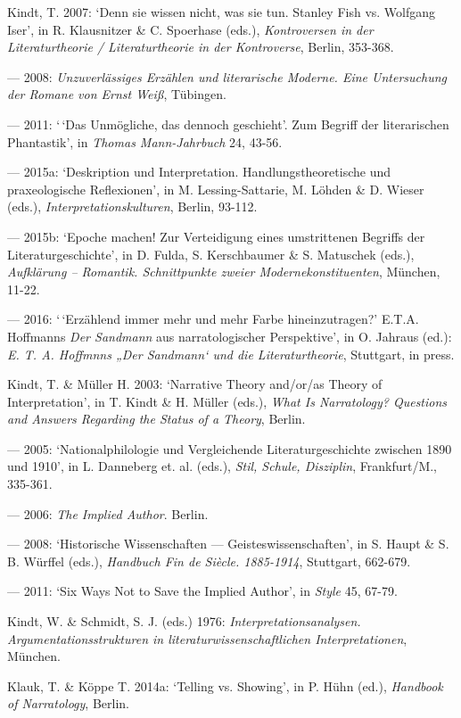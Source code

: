 \begin{hangparas}{.5cm}{1}
Kindt, T. 2007: `Denn sie wissen nicht, was sie tun. Stanley Fish vs. Wolfgang Iser', in R. Klausnitzer \& C. Spoerhase (eds.), \emph{Kontroversen in der Literaturtheorie / Literaturtheorie in der Kontroverse}, Berlin, 353-368.

--- 2008: \emph{Unzuverl\"assiges Erz\"ahlen und literarische Moderne. Eine Untersuchung der Romane von Ernst Wei{\ss}}, T\"ubingen. 

--- 2011: `\,`Das Unm\"ogliche, das dennoch geschieht'. Zum Begriff der literarischen Phantastik', in \emph{Thomas Mann-Jahrbuch} 24, 43-56.

--- 2015a: `Deskription und Interpretation. Handlungstheoretische und praxeologische Reflexionen', in M. Lessing-Sattarie, M. L\"ohden \& D. Wieser (eds.), \emph{Interpretationskulturen}, Berlin, 93-112.

--- 2015b: `Epoche machen! Zur Verteidigung eines umstrittenen Begriffs der Literaturgeschichte', in D. Fulda, S. Kerschbaumer \& S. Matuschek (eds.), \emph{Aufkl\"arung -- Romantik. Schnittpunkte zweier Modernekonstituenten}, M\"unchen, 11-22.

--- 2016: `\,`Erz\"ahlend immer mehr und mehr Farbe hineinzutragen?' E.T.A. Hoffmanns \emph{Der Sandmann} aus narratologischer Perspektive', in O. Jahraus (ed.): \emph{E. T. A. Hoffmnns „Der Sandmann` und die Literaturtheorie}, Stuttgart, in press.

Kindt, T. \& M\"uller H. 2003: `Narrative Theory and/or/as Theory of Interpretation', in T. Kindt \& H. M\"uller (eds.), \emph{What Is Narratology? Questions and Answers Regarding the Status of a Theory}, Berlin.

--- 2005: `Nationalphilologie und Vergleichende Literaturgeschichte zwischen 1890 und 1910', in L. Danneberg et. al. (eds.), \emph{Stil, Schule, Disziplin}, Frankfurt/M., 335-361.

--- 2006: \emph{The Implied Author}. Berlin.

--- 2008: `Historische Wissenschaften --- Geisteswissenschaften', in S. Haupt \& S. B. W\"urffel (eds.), \emph{Handbuch Fin de Si\`ecle. 1885-1914}, Stuttgart, 662-679.

--- 2011: `Six Ways Not to Save the Implied Author', in \emph{Style} 45, 67-79.

Kindt, W. \& Schmidt, S. J. (eds.) 1976: \emph{Interpretationsanalysen. Argumentationsstrukturen in literaturwissenschaftlichen Interpretationen}, M\"unchen.

Klauk, T. \& K\"oppe T. 2014a: `Telling vs. Showing', in P. H\"uhn (ed.), \emph{Handbook of Narratology}, Berlin.


\end{hangparas}
